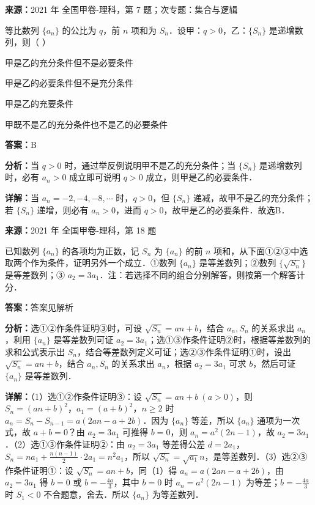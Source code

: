 \begin{question}[points=5]
\textbf{来源：}2021 年 全国甲卷-理科，第 7 题；次专题：集合与逻辑\par
等比数列 $\{a_n\}$ 的公比为 $q$，前 $n$ 项和为 $S_n$．设甲：$q>0$，乙：$\{S_n\}$ 是递增数列，则（ ）
\begin{choices}
  \item 甲是乙的充分条件但不是必要条件
  \item 甲是乙的必要条件但不是充分条件
  \item 甲是乙的充要条件
  \item 甲既不是乙的充分条件也不是乙的必要条件
\end{choices}
\begin{solution}
\textbf{答案：}B

\textbf{分析：}当 $q>0$ 时，通过举反例说明甲不是乙的充分条件；当 $\{S_n\}$ 是递增数列时，必有 $a_n>0$ 成立即可说明 $q>0$ 成立，则甲是乙的必要条件．

\textbf{详解：}当 $a_n = -2, -4, -8, \cdots$ 时，$q>0$，但 $\{S_n\}$ 递减，故甲不是乙的充分条件；若 $\{S_n\}$ 递增，则必有 $a_n>0$，进而 $q>0$，故甲是乙的必要条件．故选B．
\end{solution}
\end{question}

\begin{question}[points=12]
\textbf{来源：}2021 年 全国甲卷-理科，第 18 题\par
已知数列 $\{a_n\}$ 的各项均为正数，记 $S_n$ 为 $\{a_n\}$ 的前 $n$ 项和，从下面①②③中选取两个作为条件，证明另外一个成立．①数列 $\{a_n\}$ 是等差数列；②数列 $\{\sqrt{S_n}\}$ 是等差数列；③ $a_2 = 3a_1$．注：若选择不同的组合分别解答，则按第一个解答计分．
\begin{solution}
\textbf{答案：}答案见解析

\textbf{分析：}选①②作条件证明③时，可设 $\sqrt{S_n} = an+b$，结合 $a_n, S_n$ 的关系求出 $a_n$，利用 $\{a_n\}$ 是等差数列可证 $a_2=3a_1$；选①③作条件证明②时，根据等差数列的求和公式表示出 $S_n$，结合等差数列定义可证；选②③作条件证明①时，设出 $\sqrt{S_n}=an+b$，结合 $a_n, S_n$ 的关系求出 $a_n$，根据 $a_2=3a_1$ 可求 $b$，然后可证 $\{a_n\}$ 是等差数列．

\textbf{详解：}（1）选①②作条件证明③：设 $\sqrt{S_n}=an+b \ (a>0)$，则 $S_n = (an+b)^2$，$a_1 = (a+b)^2$，$n\ge2$ 时 $a_n = S_n - S_{n-1} = a(2an-a+2b)$．因为 $\{a_n\}$ 等差，所以 $\{a_n\}$ 通项为一次式，故 $a+b=0$？由 $a_2=3a_1$ 可推得 $b=0$，则 $a_n = a^2(2n-1)$，故 $a_2=3a_1$．（2）选①③作条件证明②：由 $a_2=3a_1$ 等差得公差 $d=2a_1$，$S_n = na_1 + \frac{n(n-1)}{2}\cdot 2a_1 = n^2 a_1$，所以 $\sqrt{S_n} = \sqrt{a_1} n$，是等差数列．（3）选②③作条件证明①：设 $\sqrt{S_n}=an+b$，同（1）得 $a_n = a(2an - a + 2b)$，由 $a_2=3a_1$ 得 $b=0$ 或 $b=-\frac{4a}{3}$，其中 $b=0$ 时 $a_n = a^2(2n-1)$ 为等差；$b=-\frac{4a}{3}$ 时 $S_1<0$ 不合题意，舍去．所以 $\{a_n\}$ 为等差数列．
\end{solution}
\end{question}

